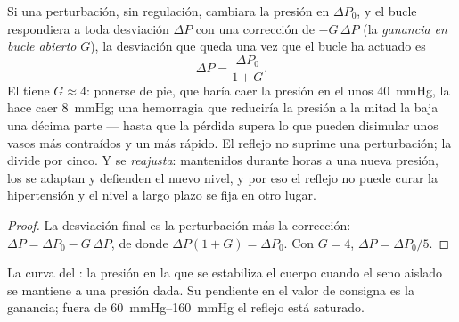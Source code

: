 \begin{theorem}\label{thm:b2:blood-pressure:gain}
Si una perturbación, sin regulación, cambiara la presión en $\Delta P_0$, y
el bucle respondiera a toda desviación $\Delta P$ con una corrección de
$-G\,\Delta P$ (la \emph{ganancia en bucle abierto} $G$), la desviación que
queda una vez que el bucle ha actuado es
\[
\Delta P = \frac{\Delta P_0}{1 + G}.
\]
El  tiene $G \approx 4$: ponerse de pie, que haría caer la
presión en el  unos \qty{40}{mmHg}, la hace caer
\qty{8}{mmHg}; una hemorragia que reduciría la presión a la mitad la baja
una décima parte --- hasta que la pérdida supera lo que pueden disimular
unos vasos más contraídos y un  más rápido. El reflejo no suprime
una perturbación; la divide por cinco. Y se \emph{reajusta}: mantenidos
durante horas a una nueva presión, los  se adaptan y
defienden el nuevo nivel, y por eso el reflejo no puede curar la
hipertensión y el nivel a largo plazo se fija en otro lugar.
\end{theorem}
\begin{proof}
La desviación final es la perturbación más la corrección:
$\Delta P = \Delta P_0 - G\,\Delta P$, de donde $\Delta P(1 + G) =
\Delta P_0$. Con $G = 4$, $\Delta P = \Delta P_0/5$.
\end{proof}

\begin{omfigure}

{\small La curva del : la presión en la que se estabiliza el
cuerpo cuando el seno aislado se mantiene a una presión dada. Su pendiente
en el valor de consigna es la ganancia; fuera de
\qtyrange{60}{160}{mmHg} el reflejo está saturado.}
\end{omfigure}

